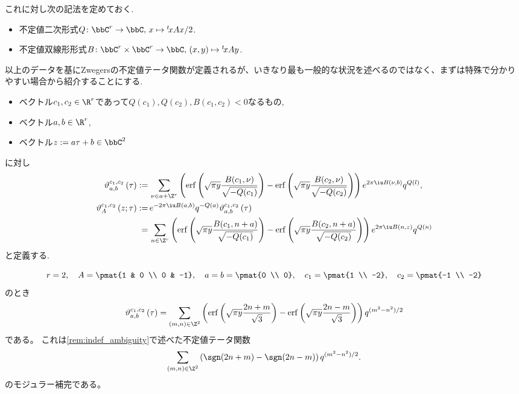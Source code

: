 \documentclass[11pt,b5paper,oneside,lualatex]{ltjsarticle} %
\DeclareMathOperator{\erf}{erf}
\numberwithin{equation}{section} %
\begin{document}
これに対し次の記法を定めておく. 

\begin{nota}
	\begin{itemize}
		\item 不定値二次形式$ Q \colon \bbC^r \to \bbC, \, x \mapsto {}^t\!x A x /2 $.
		\item 不定値双線形形式$ B \colon \bbC^r \times \bbC^r \to \bbC, \, (x, y) \mapsto {}^t\!x A y $.
	\end{itemize}
\end{nota}

以上のデータを基にZwegersの不定値テータ関数が定義されるが、いきなり最も一般的な状況を述べるのではなく、まずは特殊で分かりやすい場合から紹介することにする. 

\begin{dfn}
	\label{dfn:Zwegers_theta_special}
	\leavevmode %
	\begin{itemize}
		\item ベクトル$ c_1, c_2 \in \R^r $であって$ Q(c_1), Q(c_2), B(c_1, c_2) < 0 $なるもの,
		\item ベクトル$ a, b \in \R^r $,
		\item ベクトル$ z := a \tau + b \in \bbC^2 $
	\end{itemize}
	に対し
	\begin{align}
		\vartheta_{a, b}^{c_1, c_2} \left( \tau \right)
		:= \,
		&\sum_{\nu \in a + \Z^r}
		\left( \erf \left( \sqrt{\pi y} \frac{B(c_1, \nu)}{\sqrt{-Q(c_1)}} \right) - \erf \left( \sqrt{\pi y} \frac{B(c_2, \nu)}{\sqrt{-Q(c_2)}} \right) \right)
		e^{2\pi \iu B(\nu, b)} q^{Q(l)},
		\\
		\vartheta_{A}^{c_1, c_2} \left( z; \tau \right)
		:= \,
		&e^{-2\pi \iu B(a, b)} q^{-Q(a)} \vartheta_{a, b}^{c_1, c_2} \left( \tau \right)
		\\
		= \,
		&\sum_{n \in \Z^r}
		\left( \erf \left( \sqrt{\pi y} \frac{B(c_1, n + a)}{\sqrt{-Q(c_1)}} \right) - \erf \left( \sqrt{\pi y} \frac{B(c_2, n + a)}{\sqrt{-Q(c_2)}} \right) \right)
		e^{2\pi \iu B(n, z)} q^{Q(n)}
	\end{align}
	と定義する. 
\end{dfn}

\begin{ex}
	\[
	 r = 2, \quad
	 A = \pmat{1 & 0 \\ 0 & -1}, \quad
	 a = b = \pmat{0 \\ 0}, \quad
	 c_1= \pmat{1 \\ -2}, \quad
	 c_2= \pmat{-1 \\ -2}
	\]
	のとき
	\[
	\vartheta_{a, b}^{c_1, c_2} \left( \tau \right)
	=
	\sum_{(m, n) \in \Z^2}
	\left( \erf \left( \sqrt{\pi y} \frac{2n+m}{\sqrt{3}} \right) - \erf \left( \sqrt{\pi y} \frac{2n-m}{\sqrt{3}} \right) \right)
	q^{(m^2 - n^2)/2}
	\]
	である。
	これは\cref{rem:indef_ambiguity}で述べた不定値テータ関数
	\[
	\sum_{(m, n) \in \Z^2} \left( \sgn(2n+m) - \sgn(2n-m) \right) q^{(m^2 - n^2)/2}.
	\]
	のモジュラー補完である。
\end{ex}
\end{document}

